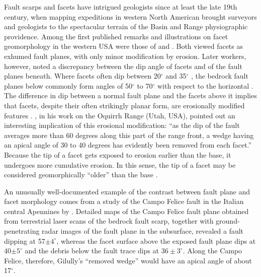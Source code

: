 Fault scarps and facets have intrigued geologists since at least the late 19th century, when mapping expeditions in western North American brought surveyors and geologists to the spectacular terrain of the Basin and Range physiographic providence. Among the first published remarks and illustrations on facet geomorphology in the western USA were those of \citet{gilbert1875report,gilbert1928studies} and \citet{davis1903mountain,davis1909geographical}. Both viewed facets as exhumed fault planes, with only minor modification by erosion. Later workers, however, noted a discrepancy between the dip angle of facets and of the fault planes beneath. Where facets often dip between 20$^\circ$ and 35$^\circ$ \citep{davis1903mountain,davis1909geographical,pack1926new,blackwelder1928recognition,gilluly1928basin,fuller1931geomorphology,anderson1977compound,wallace1978geometry,menges1990soils,petit2009faceted,wilkinson2015slip}, the bedrock fault planes below commonly form angles of 50$^\circ$ to 70$^\circ$ with respect to the horizontal \citep{schneider1925discussion,pack1926new,blackwelder1928recognition,gilluly1928basin,fuller1931geomorphology,wallace1978geometry,wilkinson2015slip}. The difference in dip between a normal fault plane and the facets above it implies that facets, despite their often strikingly planar form, are erosionally modified features \citep{pack1926new,gilluly1928basin}. \citet{gilluly1928basin}, in his work on the Oquirrh Range (Utah, USA), pointed out an interesting implication of this erosional modification: ``as the dip of the fault averages more than 60 degrees along this part of the range front, a wedge having an apical angle of 30 to 40 degrees has evidently been removed from each facet.'' Because the tip of a facet gets exposed to erosion earlier than the base, it undergoes more cumulative erosion. In this sense, the tip of a facet may be considered geomorphically ``older'' than the base \citep{gilbert1928studies,wallace1978geometry,menges1990soils}.

An unusually well-documented example of the contrast between fault plane and facet morphology comes from a study of the Campo Felice fault in the Italian central Apennines by \citet{wilkinson2015slip}. Detailed maps of the Campo Felice fault plane obtained from terrestrial laser scans of the bedrock fault scarp, together with ground-penetrating radar images of the fault plane in the subsurface, revealed a fault dipping at 57$\pm 4^\circ$, whereas the facet surface above the exposed fault plane dips at 40$\pm 5^\circ$ and the debris below the fault trace dips at $36\pm 3^\circ$. Along the Campo Felice, therefore, Gilully's ``removed wedge'' would have an apical angle of about 17$^\circ$.

